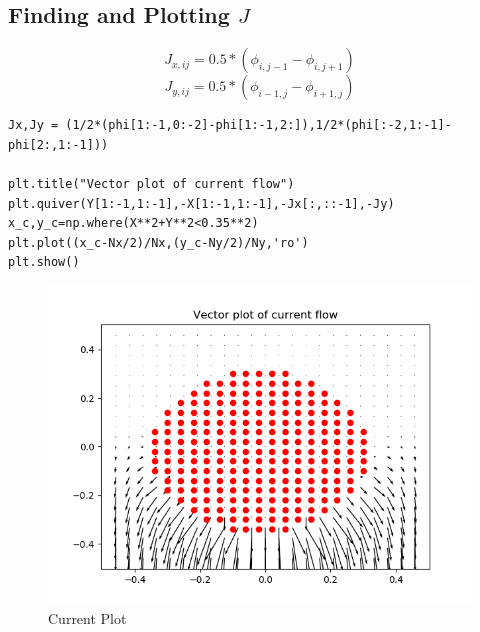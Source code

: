 \documentclass{article}
\begin{document}
\subsection*{Finding and Plotting $J$}
\begin{equation}
    J_{x,ij} = 0.5*(\phi_{i,j-1} - \phi_{i,j+1})
\end{equation}
\begin{equation}
    J_{y,ij} = 0.5*(\phi_{i-1,j} - \phi_{i+1,j})
\end{equation}
\begin{lstlisting}
Jx,Jy = (1/2*(phi[1:-1,0:-2]-phi[1:-1,2:]),1/2*(phi[:-2,1:-1]-phi[2:,1:-1]))

plt.title("Vector plot of current flow")
plt.quiver(Y[1:-1,1:-1],-X[1:-1,1:-1],-Jx[:,::-1],-Jy)
x_c,y_c=np.where(X**2+Y**2<0.35**2)
plt.plot((x_c-Nx/2)/Nx,(y_c-Ny/2)/Ny,'ro')
plt.show()
\end{lstlisting}







\begin{figure}[h!]
\centering
\includegraphics[scale=0.7]{Figure_9_5.png}
\caption{Current Plot}
\label{Current plot}
\end{figure}
\end{document}
